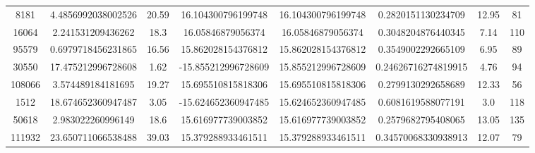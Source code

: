 \documentclass[14pt]{article} %
\begin{document}
\begin{landscape}
\begin{spacing}{1.0}
\begin{table}[h]
\begin{tabular}{|c|c|c|c|c|c|c|c|}
8181&4.4856992038002526&20.59&16.104300796199748&16.104300796199748&0.2820151130234709&12.95&81\\
16064&2.241531209436262&18.3&16.05846879056374&16.05846879056374&0.3048204876440345&7.14&110\\
95579&0.6979718456231865&16.56&15.862028154376812&15.862028154376812&0.3549002292665109&6.95&89\\
30550&17.475212996728608&1.62&-15.855212996728609&15.855212996728609&0.24626716274819915&4.76&94\\
108066&3.574489184181695&19.27&15.695510815818306&15.695510815818306&0.2799130292658689&12.33&56\\
1512&18.674652360947487&3.05&-15.624652360947485&15.624652360947485&0.6081619588077191&3.0&118\\
50618&2.983022260996149&18.6&15.616977739003852&15.616977739003852&0.2579682795408065&13.05&135\\
111932&23.650711066538488&39.03&15.379288933461511&15.379288933461511&0.34570068330938913&12.07&79\\
\hline 
\end{tabular}
\end{table}

\end{spacing}
\end{landscape}
\newpage
\end{document}
